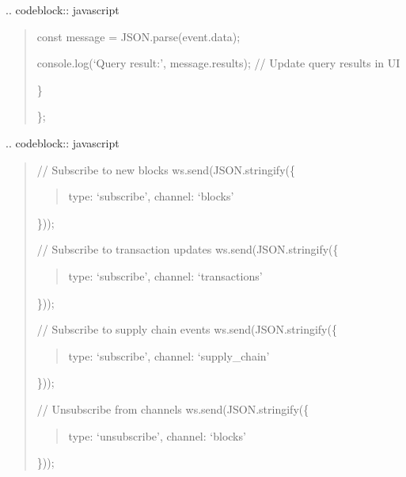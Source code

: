 \documentclass[letterpaper,10pt,english]{sphinxmanual}
\begin{document}
\sphinxAtStartPar
{}
.. code\sphinxhyphen{}block:: javascript
\begin{quote}
\begin{description}
\sphinxAtStartPar
const message = JSON.parse(event.data);
\begin{description}
\sphinxAtStartPar
console.log(‘Query result:’, message.results);
// Update query results in UI

\end{description}

\sphinxAtStartPar
\}

\end{description}

\sphinxAtStartPar
\};
\end{quote}

\sphinxAtStartPar
{}
.. code\sphinxhyphen{}block:: javascript
\begin{quote}

\sphinxAtStartPar
// Subscribe to new blocks
ws.send(JSON.stringify(\{
\begin{quote}

\sphinxAtStartPar
type: ‘subscribe’,
channel: ‘blocks’
\end{quote}

\sphinxAtStartPar
\}));

\sphinxAtStartPar
// Subscribe to transaction updates
ws.send(JSON.stringify(\{
\begin{quote}

\sphinxAtStartPar
type: ‘subscribe’,
channel: ‘transactions’
\end{quote}

\sphinxAtStartPar
\}));

\sphinxAtStartPar
// Subscribe to supply chain events
ws.send(JSON.stringify(\{
\begin{quote}

\sphinxAtStartPar
type: ‘subscribe’,
channel: ‘supply\_chain’
\end{quote}

\sphinxAtStartPar
\}));

\sphinxAtStartPar
// Unsubscribe from channels
ws.send(JSON.stringify(\{
\begin{quote}

\sphinxAtStartPar
type: ‘unsubscribe’,
channel: ‘blocks’
\end{quote}

\sphinxAtStartPar
\}));
\end{quote}
\end{document}
